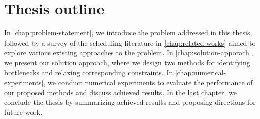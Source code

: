 \section*{Thesis outline} \label{sec:introduction/thesis-outline}

In \cref{chap:problem-statement}, we introduce the problem addressed in this thesis,
followed by a survey of the scheduling literature in \cref{chap:related-works}
aimed to explore various existing approaches to the problem.
In \cref{chap:solution-apporach}, we present our solution approach,
where we design two methods for identifying bottlenecks and relaxing corresponding constraints.
In \cref{chap:numerical-experiments}, we conduct numerical experiments to evaluate the performance
of our proposed methods and discuss achieved results.
In the last chapter, we conclude the thesis by summarizing achieved results
and proposing directions for future work.
